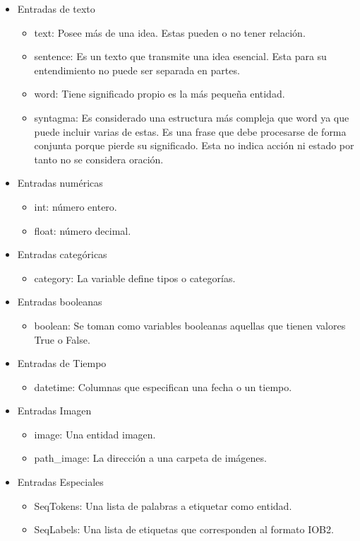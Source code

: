\begin{itemize}
    \item Entradas de texto
    \begin{itemize}
        \item text: Posee más de una idea. Estas pueden o no tener relación.
        \item sentence: Es un texto que transmite una idea esencial. Esta para su entendimiento no puede ser separada en partes.
        \item word: Tiene significado propio es la más pequeña entidad.
        \item syntagma: Es considerado una estructura más compleja que word ya que puede incluir varias de estas. Es una frase 
        que debe procesarse de forma conjunta porque pierde su significado. Esta no indica acción ni estado por tanto no se considera oración. 
    \end{itemize}      
    
    \item Entradas numéricas
    \begin{itemize}
        \item int: número entero.
        \item float: número decimal.
    \end{itemize}

    \item Entradas categóricas
    \begin{itemize}
        \item category: La variable define tipos o categorías.
    \end{itemize}
    
    \item Entradas booleanas
    \begin{itemize}
        \item boolean: Se toman como variables booleanas aquellas que tienen valores True o False.
    \end{itemize}
    
    \item Entradas de Tiempo
    \begin{itemize}
        \item datetime: Columnas que especifican una fecha o un tiempo.
    \end{itemize}
    
    \item Entradas Imagen
    \begin{itemize}
        \item image: Una entidad imagen.
        \item path\_image: La dirección a una carpeta de imágenes.
    \end{itemize}


    \item Entradas Especiales
    \begin{itemize}
        \item SeqTokens: Una lista de palabras a etiquetar como entidad.
        \item SeqLabels: Una lista de etiquetas que corresponden al formato IOB2. 
    \end{itemize}
\end{itemize}


